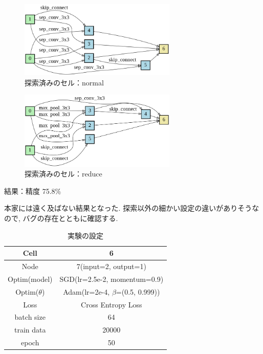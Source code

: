 \documentclass[twocolumn]{jarticle}     %
\begin{document}
\begin{figure}[tb]
	\begin{center}
		\includegraphics[clip,width=7.5cm]{complete_normal.png}
		\caption{探索済みのセル：normal}
		\label{fig:nor}
	\end{center}
\end{figure}
\begin{figure}[tb]
	\begin{center}
		\includegraphics[clip,width=7.5cm]{complete_reduce.png}
		\caption{探索済みのセル：reduce}
		\label{fig:red}
	\end{center}
\end{figure}

結果：精度 75.8\%

本家には遠く及ばない結果となった. 探索以外の細かい設定の違いがありそうなので, バグの存在とともに確認する.

\begin{table}[tb]
  \begin{center}
    \caption{実験の設定}
    \begin{tabular}{|c|c|} \hline
      Cell & 6 \\ \hline
      Node & 7(input=2, output=1) \\ \hline
      Optim(model) & SGD(lr=2.5e-2, momentum=0.9) \\ \hline
      Optim($\theta$) & Adam(lr=2e-4, $\beta$=(0.5, 0.999)) \\ \hline
      Loss & Cross Entropy Loss \\ \hline
      batch size & 64 \\ \hline
      train data & 20000 \\ \hline
      epoch & 50 \\ \hline
    \end{tabular}
    \label{tab:setting}
  \end{center}
\end{table}
\end{document}
